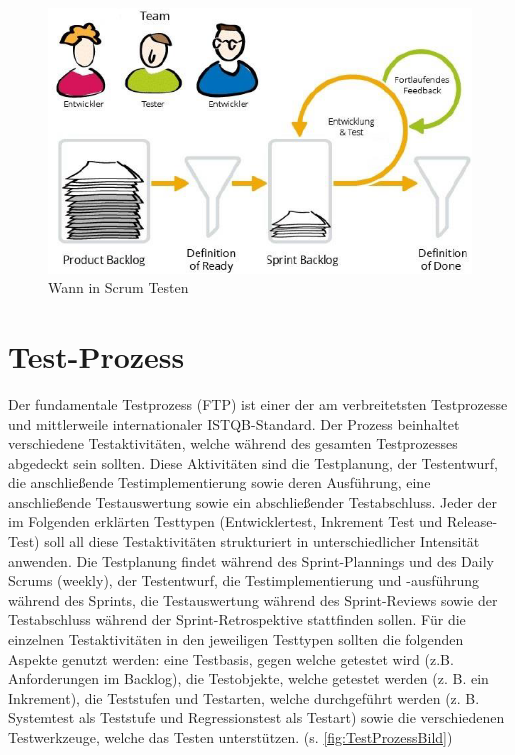 \begin{figure}[!htb]
    \centering
    \includegraphics[width=.9\textwidth]{figures/rebecca/Wann_In_Scrum_Testen.png}
    \caption[]{Wann in Scrum Testen}
    \label{fig:WannTesten}
\end{figure}

\section{Test-Prozess}
\label{sec:TestProzess}

Der fundamentale Testprozess (FTP) ist einer der am verbreitetsten Testprozesse und mittlerweile internationaler ISTQB-Standard. Der Prozess beinhaltet verschiedene Testaktivitäten, welche während des gesamten Testprozesses abgedeckt sein sollten. Diese Aktivitäten sind die Testplanung, der Testentwurf, die anschließende Testimplementierung sowie deren Ausführung, eine anschließende Testauswertung sowie ein abschließender Testabschluss. Jeder der im Folgenden erklärten Testtypen (Entwicklertest, Inkrement Test und Release-Test) soll all diese Testaktivitäten strukturiert in unterschiedlicher Intensität anwenden. Die Testplanung findet während des Sprint-Plannings und des Daily Scrums (weekly), der Testentwurf, die Testimplementierung und -ausführung während des Sprints, die Testauswertung während des Sprint-Reviews sowie der Testabschluss während der Sprint-Retrospektive stattfinden sollen. Für die einzelnen Testaktivitäten in den jeweiligen Testtypen sollten die folgenden Aspekte genutzt werden: eine Testbasis, gegen welche getestet wird (z.B. Anforderungen im Backlog), die Testobjekte, welche getestet werden (z. B. ein Inkrement), die Teststufen und Testarten, welche durchgeführt werden (z. B. Systemtest als Teststufe und Regressionstest als Testart) sowie die verschiedenen Testwerkzeuge, welche das Testen unterstützen. (s. \autoref{fig:TestProzessBild})

